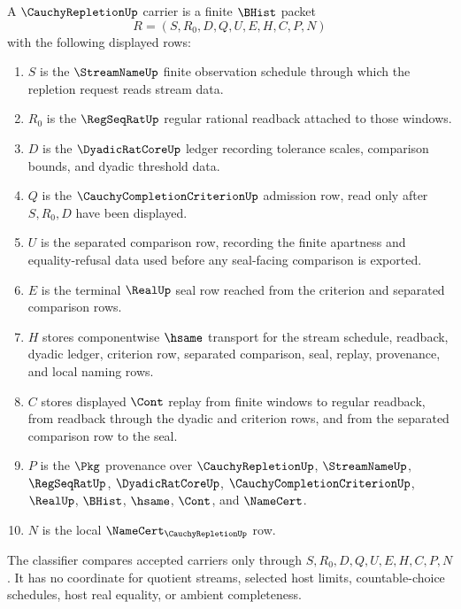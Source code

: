 \begin{definition}
\label{def:cauchy-repletion-carrier}
A $\CauchyRepletionUp$ carrier is a finite $\BHist$ packet
$$
R=(S,R_0,D,Q,U,E,H,C,P,N)
$$
with the following displayed rows:
\begin{enumerate}
\item $S$ is the $\StreamNameUp$ finite observation schedule through which the repletion request reads stream data.
\item $R_0$ is the $\RegSeqRatUp$ regular rational readback attached to those windows.
\item $D$ is the $\DyadicRatCoreUp$ ledger recording tolerance scales, comparison bounds, and dyadic threshold data.
\item $Q$ is the $\CauchyCompletionCriterionUp$ admission row, read only after $S,R_0,D$ have been displayed.
\item $U$ is the separated comparison row, recording the finite apartness and equality-refusal data used before any seal-facing comparison is exported.
\item $E$ is the terminal $\RealUp$ seal row reached from the criterion and separated comparison rows.
\item $H$ stores componentwise $\hsame$ transport for the stream schedule, readback, dyadic ledger, criterion row, separated comparison, seal, replay, provenance, and local naming rows.
\item $C$ stores displayed $\Cont$ replay from finite windows to regular readback, from readback through the dyadic and criterion rows, and from the separated comparison row to the seal.
\item $P$ is the $\Pkg$ provenance over $\CauchyRepletionUp$, $\StreamNameUp$, $\RegSeqRatUp$, $\DyadicRatCoreUp$, $\CauchyCompletionCriterionUp$, $\RealUp$, $\BHist$, $\hsame$, $\Cont$, and $\NameCert$.
\item $N$ is the local $\NameCert_{\CauchyRepletionUp}$ row.
\end{enumerate}
The classifier compares accepted carriers only through $S,R_0,D,Q,U,E,H,C,P,N$. It has no coordinate for quotient streams, selected host limits, countable-choice schedules, host real equality, or ambient completeness.
\end{definition}

